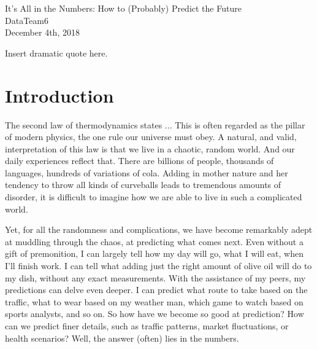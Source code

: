 \documentclass[12pt,twoside]{book}
\begin{document}
	
		\begin{bclogo}[couleur=MidnightBlue!2!white, arrondi=.645, logo=\bcvaletcoeur , ombre=true,epOmbre=.28,couleurOmbre=MidnightBlue!29, barre=none, nobreak=true ]{} \vspace{-2ex}	\centering\Huge It's All in the Numbers:\vspace{.5cm}  How to (Probably) Predict the Future\\[\baselineskip]	{\Large{DataTeam6}}\\ %
		{\large{ December 4th, 2018}}
	\end{bclogo}
	\maketitle
		\vspace*{3in}
	\tableofcontents
		\begin{savequote}[45mm]
			Insert dramatic quote here.
		\end{savequote}
	\chapter{Introduction}
	The second law of thermodynamics states ...  This is often regarded as the pillar of modern physics, the one rule our universe must obey.  A natural, and valid, interpretation of this law is that we live in a chaotic, random world.  And our daily experiences reflect that.  There are billions of people, thousands of languages, hundreds of variations of cola. Adding in mother nature and her tendency to throw all kinds of curveballs leads to tremendous amounts of disorder, it is difficult to imagine how we are able to live in such a complicated world.  
	
	Yet, for all the randomness and complications, we have become remarkably adept at muddling through the chaos, at predicting what comes next.  Even without a gift of premonition, I can largely tell how my day will go, what I will eat, when I'll finish work. I can tell what adding just the right amount of olive oil will do to my dish, without any exact measurements. With the assistance of my peers, my predictions can delve even deeper. I can predict what route to take based on the traffic, what to wear based on my weather man, which game to watch based on sports analysts, and so on.  So how have we become so good at prediction?  How can we predict finer details, such as traffic patterns, market fluctuations, or health scenarios?  Well, the answer (often) lies in the numbers.
 
\end{document}
